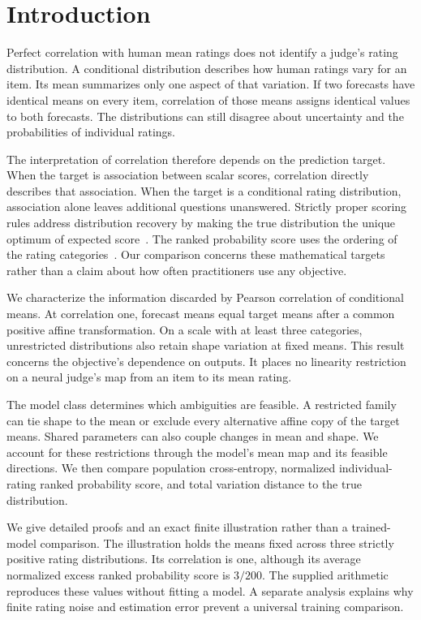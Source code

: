 \section{Introduction}
Perfect correlation with human mean ratings does not identify a judge's rating distribution.
A conditional distribution describes how human ratings vary for an item.
Its mean summarizes only one aspect of that variation.
If two forecasts have identical means on every item, correlation of those means assigns identical values to both forecasts.
The distributions can still disagree about uncertainty and the probabilities of individual ratings.

The interpretation of correlation therefore depends on the prediction target.
When the target is association between scalar scores, correlation directly describes that association.
When the target is a conditional rating distribution, association alone leaves additional questions unanswered.
Strictly proper scoring rules address distribution recovery by making the true distribution the unique optimum of expected score~\cite{gneiting2007}.
The ranked probability score uses the ordering of the rating categories~\cite{epstein1969}.
Our comparison concerns these mathematical targets rather than a claim about how often practitioners use any objective.

We characterize the information discarded by Pearson correlation of conditional means.
At correlation one, forecast means equal target means after a common positive affine transformation.
On a scale with at least three categories, unrestricted distributions also retain shape variation at fixed means.
This result concerns the objective's dependence on outputs.
It places no linearity restriction on a neural judge's map from an item to its mean rating.

The model class determines which ambiguities are feasible.
A restricted family can tie shape to the mean or exclude every alternative affine copy of the target means.
Shared parameters can also couple changes in mean and shape.
We account for these restrictions through the model's mean map and its feasible directions.
We then compare population cross-entropy, normalized individual-rating ranked probability score, and total variation distance to the true distribution.

We give detailed proofs and an exact finite illustration rather than a trained-model comparison.
The illustration holds the means fixed across three strictly positive rating distributions.
Its correlation is one, although its average normalized excess ranked probability score is $3/200$.
The supplied arithmetic reproduces these values without fitting a model.
A separate analysis explains why finite rating noise and estimation error prevent a universal training comparison.

